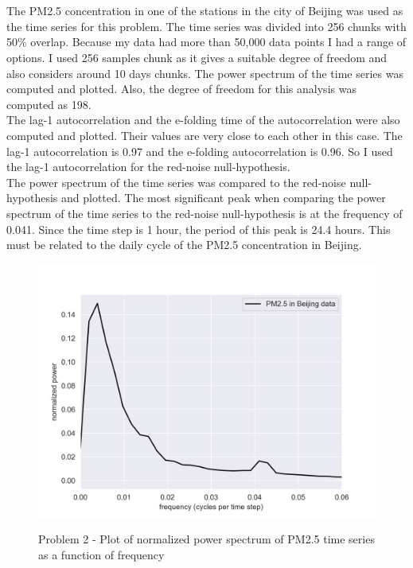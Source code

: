 \documentclass[12pt]{article}
\begin{document}
\newpage
\section{}\label{sec:problem-2}
The PM2.5 concentration in one of the stations in the city of Beijing was used as the time series for this problem.
The time series was divided into 256 chunks with 50\% overlap.
Because my data had more than 50,000 data points I had a range of options.
I used 256 samples chunk as it gives a suitable degree of freedom and also considers around 10 days chunks.
The power spectrum of the time series was computed and plotted.
Also, the degree of freedom for this analysis was computed as 198.
\\
The lag-1 autocorrelation and the e-folding time of the autocorrelation were also computed and plotted.
Their values are very close to each other in this case.
The lag-1 autocorrelation is 0.97 and the e-folding autocorrelation is 0.96. So I used the lag-1 autocorrelation for the red-noise null-hypothesis.
\\
The power spectrum of the time series was compared to the red-noise null-hypothesis and plotted.
The most significant peak when comparing the power spectrum of the time series to the red-noise null-hypothesis is at the frequency of 0.041.
Since the time step is 1 hour, the period of this peak is 24.4 hours.
This must be related to the daily cycle of the PM2.5 concentration in Beijing.
\begin{figure}
\begin{center}
\includegraphics[width=6in]{hw4_pr2_1_power_spectrum_data.png}
\caption{Problem 2 - Plot of normalized power spectrum of PM2.5 time series as a function of frequency}{\label{fig:problem-1-a}}
\end{center}
\end{figure}
\end{document}
